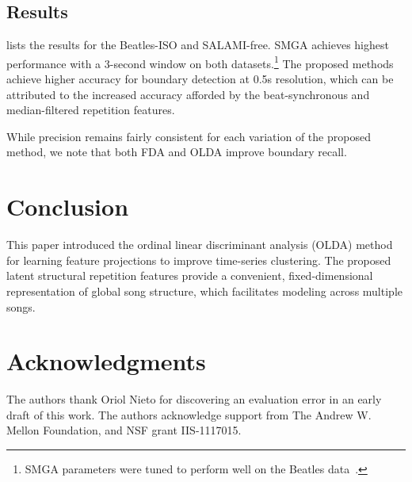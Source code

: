 \documentclass{article}
\begin{document}
\subsection{Results}
\label{sec:results}

% 

 lists the results for the Beatles-ISO and SALAMI-free.
SMGA achieves highest performance with a 3-second window on both datasets.\footnote{SMGA parameters were tuned to perform well on the Beatles data~\cite{serra2012unsupervised}.}\@
The proposed methods achieve higher accuracy for boundary detection at 0.5s resolution, which can be attributed to the increased
accuracy afforded by the beat-synchronous and median-filtered repetition features.  

While precision remains fairly consistent for each variation of the proposed method, we note that both FDA and OLDA improve boundary recall.


\section{Conclusion}
\label{sec:conclusion}
This paper introduced the ordinal linear discriminant analysis (OLDA) method for learning feature projections to improve time-series clustering.
The proposed latent structural repetition features provide a convenient, fixed-dimensional representation of global song structure, which 
facilitates modeling across multiple songs.

\section{Acknowledgments}
The authors thank Oriol Nieto for discovering an evaluation error in an early draft of this work.
The authors acknowledge support from The Andrew W. Mellon Foundation, and NSF grant IIS-1117015.



\end{document}
